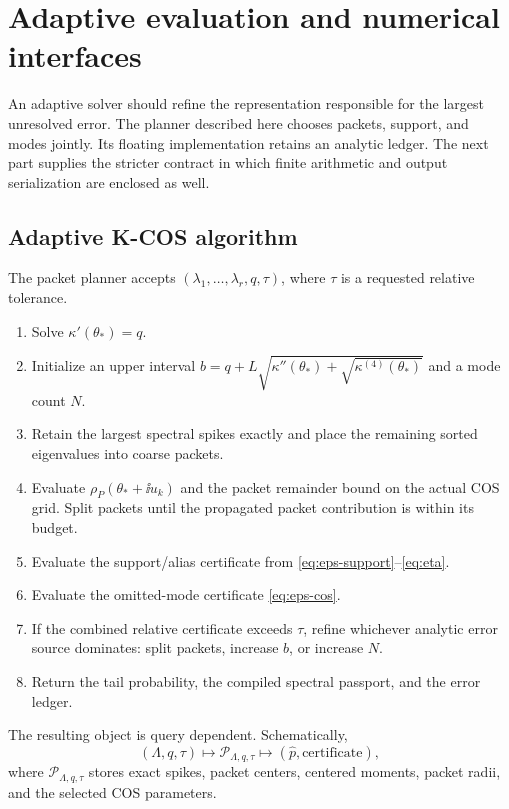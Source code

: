 \chapter{Adaptive evaluation and numerical interfaces}\label{ch:adaptive}
An adaptive solver should refine the representation responsible for the
largest unresolved error. The planner described here chooses packets, support,
and modes jointly. Its floating implementation retains an analytic ledger.
The next part supplies the stricter contract in which finite arithmetic and
output serialization are enclosed as well.
\section{Adaptive K-COS algorithm}

The packet planner accepts $(\lambda_1,\ldots,\lambda_r,q,\tau)$, where $\tau$ is a requested relative tolerance.

\begin{enumerate}[leftmargin=2em]
\item Solve $\kappa'(\theta_*)=q$.
\item Initialize an upper interval $b=q+L\sqrt{\kappa''(\theta_*)+\sqrt{\kappa^{(4)}(\theta_*)}}$ and a mode count $N$.
\item Retain the largest spectral spikes exactly and place the remaining sorted eigenvalues into coarse packets.
\item Evaluate $\rho_P(\theta_*+\ii u_k)$ and the packet remainder bound on the actual COS grid. Split packets until the propagated packet contribution is within its budget.
\item Evaluate the support/alias certificate from \eqref{eq:eps-support}--\eqref{eq:eta}.
\item Evaluate the omitted-mode certificate \eqref{eq:eps-cos}.
\item If the combined relative certificate exceeds $\tau$, refine whichever analytic error source dominates: split packets, increase $b$, or increase $N$.
\item Return the tail probability, the compiled spectral passport, and the error ledger.
\end{enumerate}

The resulting object is query dependent. Schematically,
\begin{equation}
(\Lambda,q,\tau)
\longmapsto
\mathcal P_{\Lambda,q,\tau}
\longmapsto
(\widehat p,\text{certificate}),
\label{eq:compiler-map}
\end{equation}
where $\mathcal P_{\Lambda,q,\tau}$ stores exact spikes, packet centers, centered moments, packet radii, and the selected COS parameters.


